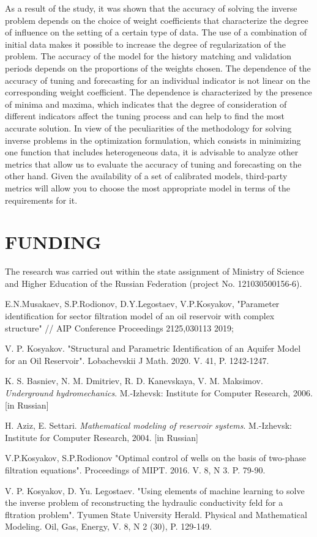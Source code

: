\documentclass[
11pt,%
tightenlines,%
twoside,%
onecolumn,%
nofloats,%
nobibnotes,%
nofootinbib,%
superscriptaddress,%
noshowpacs,%
centertags]%
{revtex4}
\begin{document}
As a result of the study, it was shown that the accuracy of solving the inverse problem depends on the choice of weight coefficients that characterize the degree of influence on the setting of a certain type of data. The use of a combination of initial data makes it possible to increase the degree of regularization of the problem. The accuracy of the model for the history matching and validation periods depends on the proportions of the weights chosen. The dependence of the accuracy of tuning and forecasting for an individual indicator is not linear on the corresponding weight coefficient. The dependence is characterized by the presence of minima and maxima, which indicates that the degree of consideration of different indicators affect the tuning process and can help to find the most accurate solution. In view of the peculiarities of the methodology for solving inverse problems in the optimization formulation, which consists in minimizing one function that includes heterogeneous data, it is advisable to analyze other metrics that allow us to evaluate the accuracy of tuning and forecasting on the other hand. Given the availability of a set of calibrated models, third-party metrics will allow you to choose the most appropriate model in terms of the requirements for it.

\section{FUNDING}
The research was carried out within the state assignment of Ministry of Science and Higher Education of the Russian Federation (project No. 121030500156-6).

\begin{thebibliography}{20}

	
 E.N.Musakaev, S.P.Rodionov, D.Y.Legostaev, V.P.Kosyakov, "Parameter identification for sector filtration model of an oil reservoir with complex structure" // AIP Conference Proceedings 2125,030113 2019;

 V. P. Kosyakov. "Structural and Parametric Identification of an Aquifer Model for an Oil Reservoir". Lobachevskii J Math. 2020. V. 41, P. 1242-1247.

 K. S. Basniev, N. M. Dmitriev, R. D. Kanevskaya, V. M. Maksimov. \textit{Underground hydromechanics}. M.-Izhevsk: Institute for Computer Research, 2006. [in Russian]

 H. Aziz, E. Settari. \textit{Mathematical modeling of reservoir systems}.  M.-Izhevsk: Institute for Computer Research, 2004. [in Russian]

 V.P.Kosyakov, S.P.Rodionov "Optimal control of wells on the basis of two-phase filtration equations". Proceedings of MIPT. 2016. V. 8, N 3. P. 79-90.

 V. P. Kosyakov,  D. Yu. Legostaev. "Using elements of machine learning to
solve the inverse problem of reconstructing the hydraulic conductivity feld for a fltration
problem". Tyumen State University Herald. Physical and Mathematical Modeling. Oil, Gas,
Energy, V. 8, N 2 (30), P. 129-149.

\end{thebibliography}
\end{document}
